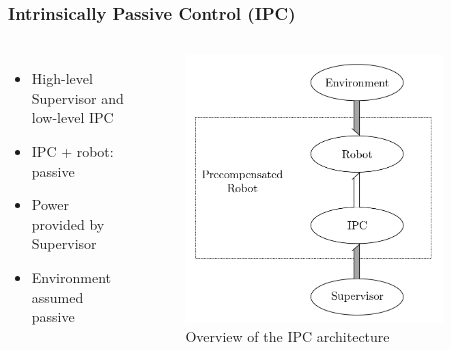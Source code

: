 \documentclass[student]{ITRslides}
\begin{document}
\begin{frame}
	\frametitle{Intrinsically Passive Control (IPC)}
	\begin{columns}
			
	
		\begin{itemize}
			\item High-level Supervisor and low-level IPC
			\item IPC + robot: passive
			\item Power provided by Supervisor
			\item Environment assumed passive
		\end{itemize}

		
             \begin{figure}[htb]
			\centering
			\includegraphics[width=0.9\textwidth]{IPCoverview.png}
			\caption{Overview of the IPC architecture 								\cite{Stramigioli_01}}
			\end{figure}
		
			
		\end{columns}
\end{frame}
\end{document}
